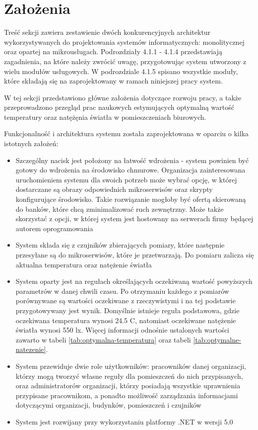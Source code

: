 \newpage
\section{Założenia}
Treść sekcji zawiera zestawienie dwóch konkurencyjnych architektur wykorzystywanych do
projektowania systemów informatycznych: monolitycznej oraz opartej na mikrousługach.
Podrozdziały 4.1.1 - 4.1.4 przedstawiają zagadnienia, na które należy zwrócić
uwagę, przygotowując system utworzony z wielu modułów usługowych. W podrozdziale 4.1.5
spisano wszystkie moduły, które składają się na zaprojektowany w ramach niniejszej pracy 
system.

W tej sekcji przedstawiono główne założenia dotyczące rozwoju pracy, a także
przeprowadzono przegląd prac naukowych estymujących optymalną wartość temperatury
oraz natężęnia światła w pomieszczeniach biurowych.

Funkcjonalność i architektura systemu została zaprojektowana w oparciu o kilka istotnych 
założeń:

\begin{itemize}
    \item Szczególny nacisk jest położony na łatwość wdrożenia - system powinien być 
    gotowy do wdrożenia na środowisko 
    chmurowe. Organizacja zainteresowana uruchomieniem systemu dla swoich potrzeb 
    może wybrać opcję, w której dostarczane są obrazy odpowiednich mikroserwisów oraz 
    skrypty konfigurujące środowisko. Takie rozwiązanie mogłoby być ofertą skierowaną 
    do banków, które chcą zminimalizować ruch zewnętrzny. Może także skorzystać z 
    opcji, w której system jest hostowany na serwerach firmy będącej autorem 
    oprogramowania
    \item System składa się z czujników zbierających pomiary, które następnie przesyłane 
    są do mikroserwisów, które je przetwarzają. Do pomiaru zalicza się aktualna 
    temperatura oraz natężenie światła
    \item System oparty jest na regułach określających oczekiwaną wartość powyższych 
    parametrów w danej chwili czasu. Po otrzymaniu każdego z pomiarów porównywane są 
    wartości oczekiwane z rzeczywistymi i na tej podstawie przygotowywany jest wynik. 
    Domyślnie istnieje reguła podstawowa, gdzie oczekiwana temperatura wynosi 24.5
    \degree C, natomiast oczekiwane natężenie światła wynosi 550 lx. 
    Więcej informacji odnośnie ustalonych wartości zawarto 
    w tabeli \ref{tab:optymalna-temperatura} oraz tabeli \ref{tab:optymalne-natezenie}.
    \item System przewiduje dwie role użytkowników: pracowników danej 
    organizacji, którzy mogą tworzyć własne reguły dla pomieszczeń do nich 
    przypisanych, oraz administratorów organizacji, którzy posiadają wszystkie 
    uprawnienia przypisane pracownikom, a ponadto możliwość zarządzania informacjami 
    dotyczącymi organizacji, budynków, pomieszczeń i czujników
    \item System jest rozwijany przy wykorzystaniu platformy .NET w wersji 5.0
\end{itemize}

